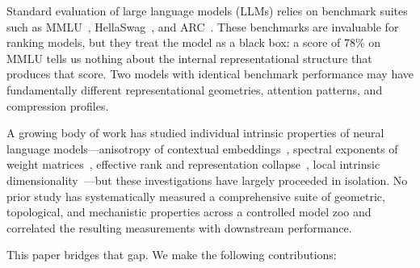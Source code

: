 \documentclass[preprint]{neurips_2025}
\begin{document}
Standard evaluation of large language models (LLMs) relies on benchmark suites such as MMLU~\citep{hendrycks2021measuring}, HellaSwag~\citep{zellers2019hellaswag}, and ARC~\citep{clark2018arc}.
These benchmarks are invaluable for ranking models, but they treat the model as a black box: a score of 78\% on MMLU tells us nothing about the internal representational structure that produces that score.
Two models with identical benchmark performance may have fundamentally different representational geometries, attention patterns, and compression profiles.

A growing body of work has studied individual intrinsic properties of neural language models---anisotropy of contextual embeddings~\citep{ethayarajh2019contextual}, spectral exponents of weight matrices~\citep{martin2021implicit}, effective rank and representation collapse~\citep{jing2021understanding}, local intrinsic dimensionality~\citep{ma2018characterizing}---but these investigations have largely proceeded in isolation.
No prior study has systematically measured a comprehensive suite of geometric, topological, and mechanistic properties across a controlled model zoo and correlated the resulting measurements with downstream performance.

This paper bridges that gap. We make the following contributions:
\end{document}
